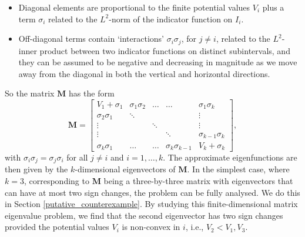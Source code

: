 \documentclass[preprint,12pt]{elsarticle}
\newcommand{\M}{\mathbf{M}}
\begin{document}
\begin{itemize}
    \item Diagonal elements are proportional to the finite potential values $V_i$ plus a term $\sigma_i$ related to the $L^2$-norm of the indicator function on $I_i$.
    \item Off-diagonal terms contain `interactions' $\sigma_i\sigma_j$, for $j\neq i$, related to the $L^2$-inner product between two indicator functions on distinct subintervals, and they can be assumed to be negative and decreasing in magnitude as we move away from the diagonal in both the vertical and horizontal directions.
\end{itemize}
So the matrix $\M$ has the form\\
\begin{equation}\label{matrix_putative_counterexample}
\M=\begin{bmatrix}
V_1+\sigma_1        & \sigma_1\sigma_2  & \dots             & \dots                 & \sigma_1\sigma_k      \\
\sigma_2\sigma_1    & \ddots            &                   &                       & \vdots                \\
\vdots              &                   & \ddots            &                       & \vdots                \\
\vdots              &                   &                   & \ddots                & \sigma_{k-1}\sigma_k  \\
\sigma_k\sigma_1    & \dots             & \dots             & \sigma_k\sigma_{k-1}  & V_k+\sigma_k
\end{bmatrix},
\end{equation}
with $\sigma_i\sigma_j=\sigma_j\sigma_i$ for all $j\neq i$ and $i=1,\ldots,k$. The approximate eigenfunctions are then given by the $k$-dimensional eigenvectors of $\M$. In the simplest case, where $k=3$, corresponding to $\M$ being a three-by-three matrix with eigenvectors that can have at most two sign changes, the problem can be fully analysed. We do this in Section \ref{putative_counterexample}. By studying this finite-dimensional matrix eigenvalue problem, we find that the second eigenvector has two sign changes provided the potential values $V_i$ is non-convex in $i$, i.e., $V_2<V_1,V_3$.\\
\end{document}
